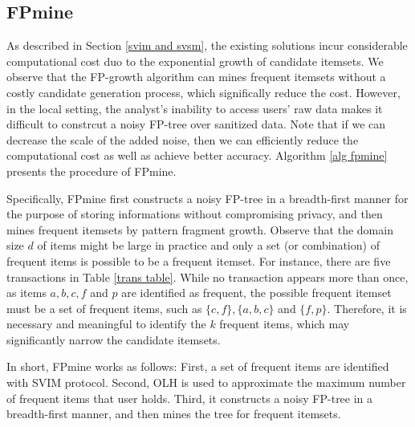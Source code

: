 \documentclass[conference]{IEEEtran}
\begin{document}
\subsection{FPmine}
\label{fpmine}
As described in Section \ref{svim and svsm}, the existing solutions incur considerable computational cost duo to the exponential growth of candidate itemsets. We observe that the FP-growth algorithm can mines frequent itemsets without a costly candidate generation process, which significally reduce the cost. However, in the local setting, the analyst's inability to access users' raw data makes it difficult to constrcut a noisy FP-tree over sanitized data. Note that if we can decrease the scale of the added noise, then we can efficiently reduce the computational cost as well as achieve better accuracy. Algorithm \ref{alg fpmine} presents the procedure of FPmine.

Specifically, FPmine first constructs a noisy FP-tree in a breadth-first manner for the purpose of storing informations without compromising privacy, and then mines frequent itemsets by pattern fragment growth. Observe that the domain size $d$ of items might be large in practice and only a set (or combination) of frequent items is possible to be a frequent itemset. For instance, there are five transactions in Table \ref{trans table}. While no transaction appears more than once, as items $a,b,c,f$ and $p$ are identified as frequent, the possible frequent itemset must be a set of frequent items, such as $\{c,f\},\{a,b,c\}$ and $\{f,p\}$. Therefore, it is necessary and meaningful to identify the $k$ frequent items, which may significantly narrow the candidate itemsets. 

In short, FPmine works as follows: First, a set of frequent items are identified with SVIM protocol. Second, OLH is used to approximate the maximum number of frequent items that user holds. Third, it constructs a noisy FP-tree in a breadth-first manner, and then mines the tree for frequent itemsets.
\end{document}
